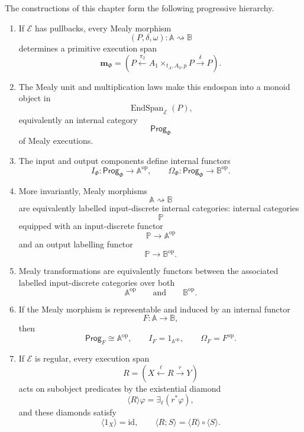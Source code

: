\begin{theorem}
\label{thm:mealy-programs-dynamic-proarrow-logic}
The constructions of this chapter form the following progressive hierarchy.

\begin{enumerate}
\item If \(\mathcal E\) has pullbacks, every Mealy morphism
\[
(P,\delta,\omega):\mathbb A\rightsquigarrow\mathbb B
\]
determines a primitive execution span
\[
\mathbf m_\Phi
=
\left(
P\xleftarrow{\pi_2}
A_1\times_{t_A,A_0,p}P
\xrightarrow{\delta}
P
\right).
\]

\item The Mealy unit and multiplication laws make this endospan into a monoid object in
\[
\operatorname{EndSpan}_{\mathcal E}(P),
\]
equivalently an internal category
\[
\mathsf{Prog}_\Phi
\]
of Mealy executions.

\item The input and output components define internal functors
\[
I_\Phi:\mathsf{Prog}_\Phi\to\mathbb A^{\mathrm{op}},
\qquad
\Omega_\Phi:\mathsf{Prog}_\Phi\to\mathbb B^{\mathrm{op}}.
\]

\item More invariantly, Mealy morphisms
\[
\mathbb A\rightsquigarrow\mathbb B
\]
are equivalently labelled input-discrete internal categories: internal categories
\[
\mathbb P
\]
equipped with an input-discrete functor
\[
\mathbb P\to\mathbb A^{\mathrm{op}}
\]
and an output labelling functor
\[
\mathbb P\to\mathbb B^{\mathrm{op}}.
\]

\item Mealy transformations are equivalently functors between the associated labelled input-discrete categories over both
\[
\mathbb A^{\mathrm{op}}
\qquad
\text{and}
\qquad
\mathbb B^{\mathrm{op}}.
\]

\item If the Mealy morphism is representable and induced by an internal functor
\[
F:\mathbb A\to\mathbb B,
\]
then
\[
\mathsf{Prog}_F\cong\mathbb A^{\mathrm{op}},
\qquad
I_F=1_{\mathbb A^{\mathrm{op}}},
\qquad
\Omega_F=F^{\mathrm{op}}.
\]

\item If \(\mathcal E\) is regular, every execution span
\[
R=
\left(
X\xleftarrow{\ell}R\xrightarrow{r}Y
\right)
\]
acts on subobject predicates by the existential diamond
\[
\langle R\rangle\varphi
=
\exists_\ell(r^\ast\varphi),
\]
and these diamonds satisfy
\[
\langle 1_X\rangle=\mathrm{id},
\qquad
\langle R;S\rangle=\langle R\rangle\circ\langle S\rangle.
\]


\end{enumerate}
\end{theorem}
